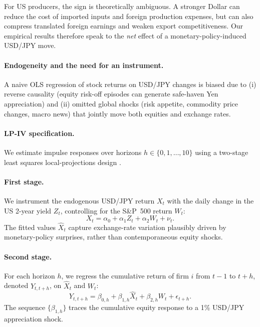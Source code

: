 \documentclass[12pt,a4paper]{article}
\begin{document}
For US producers, the sign is theoretically ambiguous. A stronger Dollar can reduce the cost of imported inputs and foreign production expenses, but can also compress translated foreign earnings and weaken export competitiveness. Our empirical results therefore speak to the \emph{net} effect of a monetary-policy-induced USD/JPY move.

\paragraph{Endogeneity and the need for an instrument.}

A naive OLS regression of stock returns on USD/JPY changes is biased due to (i) reverse causality (equity risk-off episodes can generate safe-haven Yen appreciation) and (ii) omitted global shocks (risk appetite, commodity price changes, macro news) that jointly move both equities and exchange rates.

\paragraph{LP-IV specification.}

We estimate impulse responses over horizons $h \in \{0,1,\ldots,10\}$ using a two-stage least squares local-projections design \citep{jorda2005}.

\paragraph{First stage.} We instrument the endogenous USD/JPY return $X_t$ with the daily change in the US 2-year yield $Z_t$, controlling for the S\&P~500 return $W_t$:
\begin{equation}
X_t = \alpha_0 + \alpha_1 Z_t + \alpha_2 W_t + \nu_t.
\end{equation}
The fitted values $\widehat{X}_t$ capture exchange-rate variation plausibly driven by monetary-policy surprises, rather than contemporaneous equity shocks.

\paragraph{Second stage.} For each horizon $h$, we regress the cumulative return of firm $i$ from $t-1$ to $t+h$, denoted $Y_{t,t+h}$, on $\widehat{X}_t$ and $W_t$:
\begin{equation}
Y_{t,t+h} = \beta_{0,h} + \beta_{1,h} \widehat{X}_t + \beta_{2,h} W_t + \epsilon_{t+h}.
\end{equation}
The sequence $\{\beta_{1,h}\}$ traces the cumulative equity response to a 1\% USD/JPY appreciation shock.
\end{document}
